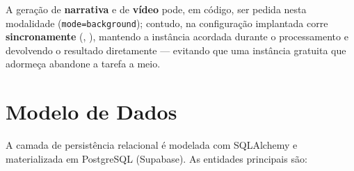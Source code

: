 A geração de \textbf{narrativa} e de \textbf{vídeo} pode, em código, ser
pedida nesta modalidade (\texttt{mode=background}); contudo, na
configuração implantada corre \textbf{sincronamente} (,
), mantendo a instância acordada durante o processamento
e devolvendo o resultado diretamente --- evitando que uma instância gratuita
que adormeça abandone a tarefa a meio.

\section{Modelo de Dados}
\label{sec:modelo_dados}

A camada de persistência relacional é modelada com SQLAlchemy e materializada
em PostgreSQL (Supabase). As entidades principais são:

